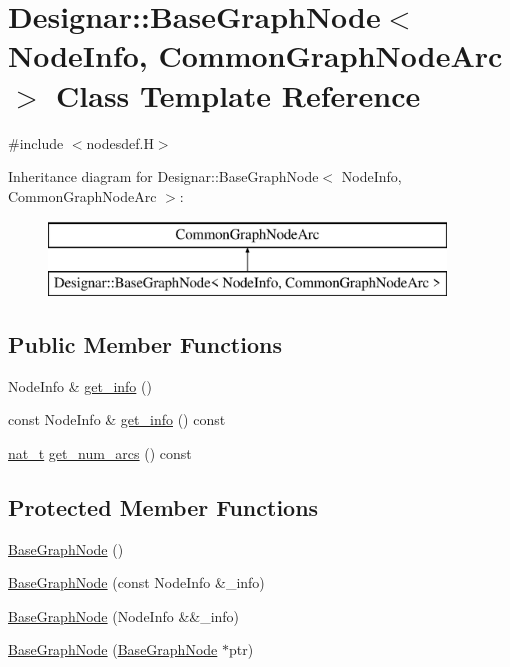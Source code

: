 \hypertarget{class_designar_1_1_base_graph_node}{}\section{Designar\+:\+:Base\+Graph\+Node$<$ Node\+Info, Common\+Graph\+Node\+Arc $>$ Class Template Reference}
\label{class_designar_1_1_base_graph_node}


{\ttfamily \#include $<$nodesdef.\+H$>$}

Inheritance diagram for Designar\+:\+:Base\+Graph\+Node$<$ Node\+Info, Common\+Graph\+Node\+Arc $>$\+:\begin{figure}[H]
\begin{center}
\leavevmode
\includegraphics[height=2.000000cm]{class_designar_1_1_base_graph_node}
\end{center}
\end{figure}
\subsection*{Public Member Functions}
\begin{DoxyCompactItemize}
\item 
Node\+Info \& \hyperlink{class_designar_1_1_base_graph_node_a5626bf91fcef0dd6f29dc503c33ecfc9}{get\+\_\+info} ()
\item 
const Node\+Info \& \hyperlink{class_designar_1_1_base_graph_node_a2f9f7069df485bc555066eb57d05e7a8}{get\+\_\+info} () const
\item 
\hyperlink{namespace_designar_aa72662848b9f4815e7bf31a7cf3e33d1}{nat\+\_\+t} \hyperlink{class_designar_1_1_base_graph_node_a3dbfd6cc251093522f54d51956968c54}{get\+\_\+num\+\_\+arcs} () const
\end{DoxyCompactItemize}
\subsection*{Protected Member Functions}
\begin{DoxyCompactItemize}
\item 
\hyperlink{class_designar_1_1_base_graph_node_a6eb12fac0ce731cb881c31b095493ef5}{Base\+Graph\+Node} ()
\item 
\hyperlink{class_designar_1_1_base_graph_node_ada20ee8b29e8372f93b7deb6a93c2be1}{Base\+Graph\+Node} (const Node\+Info \&\+\_\+info)
\item 
\hyperlink{class_designar_1_1_base_graph_node_a3e36c23ee7f22345b2ebbad09304dca0}{Base\+Graph\+Node} (Node\+Info \&\&\+\_\+info)
\item 
\hyperlink{class_designar_1_1_base_graph_node_aa64ba400e5d1fff18b7fb10071e7b97c}{Base\+Graph\+Node} (\hyperlink{class_designar_1_1_base_graph_node}{Base\+Graph\+Node} $\ast$ptr)
\end{DoxyCompactItemize}
